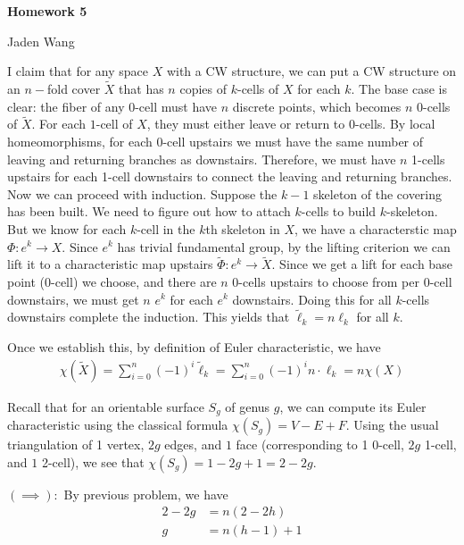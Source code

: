 \documentclass[12pt]{article}
\begin{document}
\centerline {\textsf{\textbf{\LARGE{Homework 5}}}}
\centerline {Jaden Wang}
\vspace{.15in}

\begin{problem}[5]
I claim that for any space $ X$ with a CW structure, we can put a CW structure on an $ n-$fold cover $ \widetilde{ X}$ that has $ n$ copies of $ k$-cells of  $ X$ for each  $ k$. The base case is clear: the fiber of any $ 0$-cell must have  $ n$ discrete points, which becomes  $ n$ 0-cells of  $ \widetilde{ X}$. For each $ 1$-cell of  $ X$, they must either leave or return to 0-cells. By local homeomorphisms, for each 0-cell upstairs we must have the same number of leaving and returning branches as downstairs. Therefore, we must have $ n$ 1-cells upstairs for each 1-cell downstairs to connect the leaving and returning branches. Now we can proceed with induction. Suppose the  $ k-1$ skeleton  of the covering has been built. We need to figure out how to attach  $ k$-cells to build $ k$-skeleton. But we know for each  $ k$-cell in the  $ k$th skeleton in  $ X$, we have a characterstic map  $ \Phi: e^{k} \to X$. Since $ e^{k}$ has trivial fundamental group, by the lifting criterion we can lift it to a characteristic map upstairs $ \widetilde{ \Phi}: e^{k} \to \widetilde{ X}$. Since we get a lift for each base point (0-cell) we choose, and there are $ n$ 0-cells upstairs to choose from per $ 0$-cell downstairs, we must get $ n$  $ e^{k}$ for each $ e^{k}$ downstairs. Doing this for all $ k$-cells downstairs complete the induction. This yields that $ \widetilde{ \ell}_k = n \ell_k$ for all $ k$. 

Once we establish this, by definition of Euler characteristic, we have
\begin{align*}
	\chi (\widetilde{ X} ) = \sum_{ i= 0}^{ n} (-1)^{i} \widetilde{ \ell}_k = \sum_{ i= 0}^{ n} (-1)^{i} n \cdot \ell_k = n \chi (X)
\end{align*}
\end{problem}

\begin{problem}[6]
Recall that for an orientable surface $ S_g$ of genus $ g$, we can compute its Euler characteristic using the classical formula $ \chi(S_g) = V-E+F$. Using the usual triangulation of 1 vertex, $ 2g$ edges, and  $ 1$ face (corresponding to 1 0-cell,  $ 2g$ 1-cell, and  $ 1$ 2-cell), we see that  $ \chi(S_g) = 1-2g+1 = 2-2g$. 

$ (\implies):$ By previous problem, we have
\begin{align*}
	2-2g  &= n(2-2h) \\
	g&= n(h-1) +1
\end{align*}
\end{problem}
\end{document}
